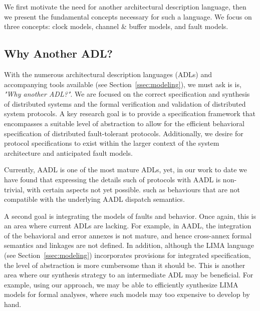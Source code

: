 We first motivate the need for another architectural description language, then we present the fundamental concepts necessary for such a language. We focus on three concepts: clock models, channel \& buffer models, and fault models.

\subsection{Why Another ADL?}

With the numerous architectural description languages (ADLs) and accompanying
tools available (see Section~\ref{ssec:modeling}), we must ask is
is, \emph{"Why another ADL?"}.
We are focused on the correct specification and synthesis of distributed systems
and the formal verification and validation of distributed system protocols.  A
key research goal is to provide a specification framework that encompasses a
suitable level of abstraction to allow for the efficient behavioral
specification of distributed fault-tolerant protocols.  Additionally, we desire
for protocol specifications to exist within the larger context of the system
architecture and anticipated fault models.

Currently, AADL is one of the most mature ADLs, yet, in our work to date we have
found that expressing the details such of protocols with AADL is non-trivial,
with certain aspects not yet possible. such as behaviours that are not
compatible with the underlying AADL dispatch semantics.


A second goal is integrating the models of faults and behavior.  Once again,
this is an area where current ADLs are lacking. For example, in
AADL, the integration of the behavioral and error annexes is not mature, and
hence cross-annex formal semantics and linkages are not defined.  In addition,
although the LIMA language (see Section~\ref{ssec:modeling}) incorporates provisions
for integrated specification, the level of abstraction is more
cumbersome than it should be.  This is another area where our
synthesis strategy to an intermediate ADL may be beneficial. For example, using
our approach, we may be able to efficiently synthesize LIMA models for formal
analyses, where such models may too expensive to develop by hand.

